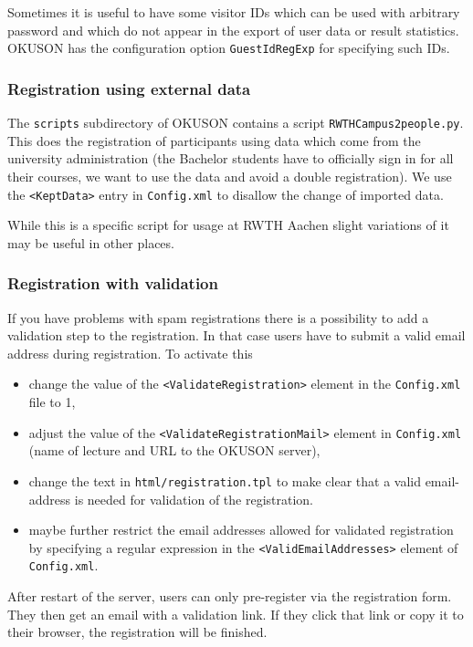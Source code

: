 \documentclass[12pt,openany,a4paper]{book}
\newcommand{\OKUSON}{\textsf{OKUSON}}
\begin{document}
Sometimes it is useful to have some visitor IDs which can be used with
arbitrary password and which do not appear in the export of user data or
result statistics. {\OKUSON} has the configuration option 
\texttt{GuestIdRegExp} for specifying such IDs.

\subsubsection*{Registration using external data}

The \texttt{scripts} subdirectory of {\OKUSON}  contains
a script  \texttt{RWTHCampus2people.py}. This does the registration of
participants using data which come from the university administration 
(the Bachelor students have to officially sign in for all their courses,
we want to use the data and avoid a double registration).
We use the \verb!<KeptData>! entry in \texttt{Config.xml} to disallow
the change of imported data.

While this is a specific script for usage at RWTH Aachen slight variations
of it may be useful in other places.

\subsubsection*{Registration with validation}

If you have problems with spam registrations there is a possibility to 
add a validation step to the registration. In that case users have to submit
a valid email address during registration. To activate this 
\begin{itemize}
\item change the value of the \texttt{<ValidateRegistration>} element in
the \texttt{Config.xml} file to 1,
\item adjust the value of the \texttt{<ValidateRegistrationMail>} element
in \texttt{Config.xml} (name of lecture and URL to the OKUSON server),
\item change the text in \texttt{html/registration.tpl} to make clear that
a valid email-address is needed for validation of the registration.
\item maybe further restrict the email addresses allowed for validated
registration by specifying a regular expression in the
\texttt{<ValidEmailAddresses>} element of \texttt{Config.xml}.
\end{itemize}

After restart of the server, users can only pre-register via the
registration form. They then get an email with a validation link. 
If they click that link or copy it to their browser, the registration will
be finished.
\end{document}
